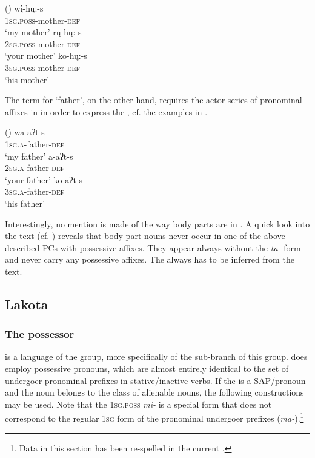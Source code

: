 \documentclass[output=paper]{LSP/langsci}
\begin{document}
\ea {} (\citealt[45]{Mixco1997a}) \label{mandanmother}
\ea
\gll wį-hų:-s \\			
\textsc{1sg.poss}-mother-\textsc{def} \\
\glt `my mother'
\ex \gll rų-hų:-s \\
\textsc{2sg.poss}-mother-\textsc{def} \\
\glt `your mother'
\ex \gll ko-hų:-s \\
\textsc{3sg.poss}-mother-\textsc{def} \\
\glt `his mother'
\z \z

The term for `father', on the other hand, requires the actor series of pronominal affixes in  in order to express the , cf. the examples in .

\ea {} (\citealt[45]{Mixco1997a}) \label{mandanfather}
\ea \gll wa-aʔt-s \\
\textsc{1sg.a}-father-\textsc{def} \\
\glt `my father'
\ex \gll a-aʔt-s \\
\textsc{2sg.a}-father-\textsc{def} \\
\glt `your father'
\ex \gll ko-aʔt-s \\
\textsc{3sg.a}-father-\textsc{def} \\
\glt `his father'
\z \z

Interestingly, no mention is made of the way body parts are  in . A quick look into the  text (cf. \citealt[66ff]{Mixco1997a}) reveals that body-part nouns never occur in one of the above described PCs with possessive affixes. They appear always without the \textit{ta-} form and never carry any possessive affixes. The  always has to be inferred from the text.
 
\subsection{Lakota}\label{sec:helmbrecht:4.4} \label{lakota} 
\subsubsection{The possessor}
 is a language of the  group, more specifically of the  sub-branch of this group.  does employ possessive pronouns, which are almost entirely identical to the set of undergoer pronominal prefixes in stative/inactive verbs. If the  is a SAP/pronoun and the  noun belongs to the class of alienable nouns, the following constructions may be used. Note that the \textsc{1sg.poss} \textit{mi-} is a special form that does not correspond to the regular \textsc{1sg} form of the pronominal undergoer prefixes (\textit{ma-}).\footnote{Data in this section has been re-spelled in the current  .}
\end{document}
